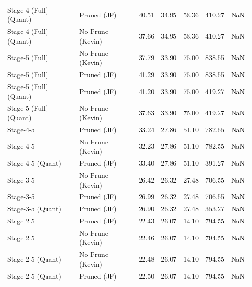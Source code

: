 \begin{table}
\begin{tabular}{llrrrrl}
Stage-4 (Full)
(Quant) & Pruned (JF) & 40.51 & 34.95 & 58.36 & 410.27 & NaN \\
Stage-4 (Full)
(Quant) & No-Prune (Kevin) & 37.66 & 34.95 & 58.36 & 410.27 & NaN \\
Stage-5 (Full) & No-Prune (Kevin) & 37.79 & 33.90 & 75.00 & 838.55 & NaN \\
Stage-5 (Full) & Pruned (JF) & 41.29 & 33.90 & 75.00 & 838.55 & NaN \\
Stage-5 (Full)
(Quant) & Pruned (JF) & 41.20 & 33.90 & 75.00 & 419.27 & NaN \\
Stage-5 (Full)
(Quant) & No-Prune (Kevin) & 37.63 & 33.90 & 75.00 & 419.27 & NaN \\
Stage-4-5 & Pruned (JF) & 33.24 & 27.86 & 51.10 & 782.55 & NaN \\
Stage-4-5 & No-Prune (Kevin) & 32.23 & 27.86 & 51.10 & 782.55 & NaN \\
Stage-4-5
(Quant) & Pruned (JF) & 33.40 & 27.86 & 51.10 & 391.27 & NaN \\
Stage-3-5 & No-Prune (Kevin) & 26.42 & 26.32 & 27.48 & 706.55 & NaN \\
Stage-3-5 & Pruned (JF) & 26.99 & 26.32 & 27.48 & 706.55 & NaN \\
Stage-3-5
(Quant) & Pruned (JF) & 26.90 & 26.32 & 27.48 & 353.27 & NaN \\
Stage-2-5 & Pruned (JF) & 22.43 & 26.07 & 14.10 & 794.55 & NaN \\
Stage-2-5 & No-Prune (Kevin) & 22.46 & 26.07 & 14.10 & 794.55 & NaN \\
Stage-2-5
(Quant) & No-Prune (Kevin) & 22.48 & 26.07 & 14.10 & 794.55 & NaN \\
Stage-2-5
(Quant) & Pruned (JF) & 22.50 & 26.07 & 14.10 & 794.55 & NaN \\
\bottomrule
\end{tabular}
\end{table}
